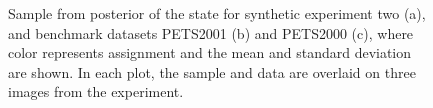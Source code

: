 \documentclass[smallcondensed, final]{svjour3}
\begin{document}
\begin{figure}[h]
	\centering
    \caption{\label{fig:synth2_alphaimg} Sample from posterior of the state for synthetic experiment two (a), and benchmark datasets PETS2001 (b) and PETS2000 (c), where color represents assignment and the mean and standard deviation are shown. In each plot, the sample and data are overlaid on three images from the experiment.}
\end{figure}



\end{document}
